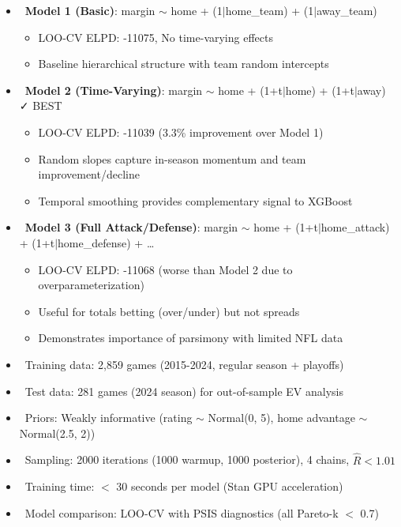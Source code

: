 \begin{itemize}
  \item \done\ \textbf{Model 1 (Basic)}: margin $\sim$ home + (1$|$home\_team) + (1$|$away\_team)
  \begin{itemize}
    \item LOO-CV ELPD: -11075, No time-varying effects
    \item Baseline hierarchical structure with team random intercepts
  \end{itemize}
  \item \done\ \textbf{Model 2 (Time-Varying)}: margin $\sim$ home + (1+t$|$home) + (1+t$|$away) \textcolor{green!60!black}{✓ BEST}
  \begin{itemize}
    \item LOO-CV ELPD: -11039 (3.3\% improvement over Model 1)
    \item Random slopes capture in-season momentum and team improvement/decline
    \item Temporal smoothing provides complementary signal to XGBoost
  \end{itemize}
  \item \done\ \textbf{Model 3 (Full Attack/Defense)}: margin $\sim$ home + (1+t$|$home\_attack) + (1+t$|$home\_defense) + \dots
  \begin{itemize}
    \item LOO-CV ELPD: -11068 (worse than Model 2 due to overparameterization)
    \item Useful for totals betting (over/under) but not spreads
    \item Demonstrates importance of parsimony with limited NFL data
  \end{itemize}
\end{itemize}

\begin{itemize}
  \item \done\ Training data: 2,859 games (2015-2024, regular season + playoffs)
  \item \done\ Test data: 281 games (2024 season) for out-of-sample EV analysis
  \item \done\ Priors: Weakly informative (rating $\sim$ Normal(0, 5), home advantage $\sim$ Normal(2.5, 2))
  \item \done\ Sampling: 2000 iterations (1000 warmup, 1000 posterior), 4 chains, $\hat{R} < 1.01$
  \item \done\ Training time: $<$ 30 seconds per model (Stan GPU acceleration)
  \item \done\ Model comparison: LOO-CV with PSIS diagnostics (all Pareto-k $<$ 0.7)
\end{itemize}

